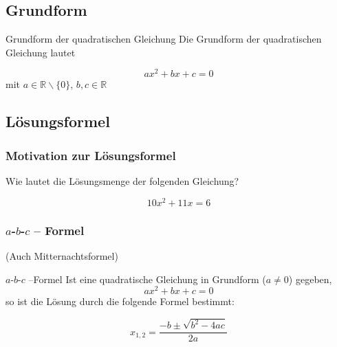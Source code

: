 \newpage




\subsection{Grundform}

\begin{definition}{Grundform der quadratischen Gleichung}{}
  Die Grundform der quadratischen Gleichung lautet

  $$ax^2+bx+c=0$$
  mit $a\in \mathbb{R}\backslash\{0\}$, $b, c \in \mathbb{R}$
\end{definition}
\newpage

\TALS{
}%


\subsection{Lösungsformel}
\subsubsection{Motivation zur Lösungsformel}
Wie lautet die Lösungsmenge der folgenden Gleichung?

$$10x^2+11x = 6$$



\newpage
\TALS{}

\newpage



\subsubsection{$a$-$b$-$c$ -- Formel}
(Auch Mitternachtsformel)



\begin{gesetz}{$a$-$b$-$c$ --Formel}{}
Ist eine quadratische Gleichung in Grundform ($a\ne 0$) gegeben,
$$ax^2 + bx + c = 0$$
so ist die Lösung durch die folgende Formel bestimmt:

$$x_{1,2}=\frac{-b\pm\sqrt{b^2-4ac}}{2a}$$
\end{gesetz}
\newpage



